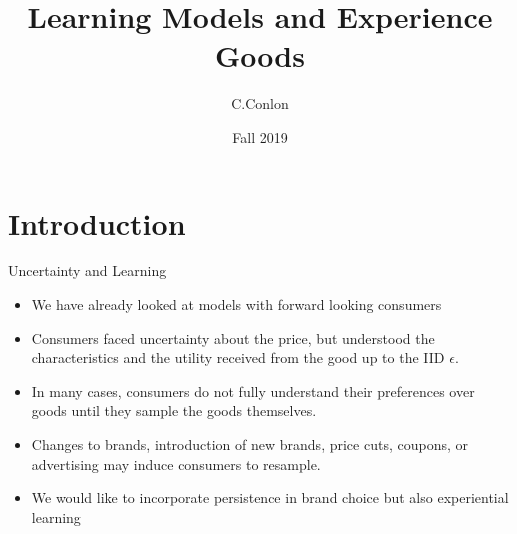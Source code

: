 \documentclass[xcolor=pdftex,dvipsnames,table,mathserif,aspectratio=169]{beamer}
\title [Dynamic Demand I]{Learning Models and Experience Goods}
\author{C.Conlon}
\institute{Grad IO }
\date{Fall 2019}
\begin{document}
\begin{frame}
\titlepage
\end{frame}



\section*{Introduction}



\begin{frame}{Uncertainty and Learning}
\begin{itemize}
\item We have already looked at models with forward looking consumers
\item Consumers faced uncertainty about the price, but understood the characteristics and the utility received from the good up to the IID $\epsilon$.
\item In many cases, consumers do not fully understand their preferences over goods until they sample the goods themselves.
\item Changes to brands, introduction of new brands, price cuts, coupons, or advertising may induce consumers to resample.
\item We would like to incorporate \alert{persistence} in brand choice but also \alert{experiential learning}
\end{itemize}
\end{frame} 
\end{document}
